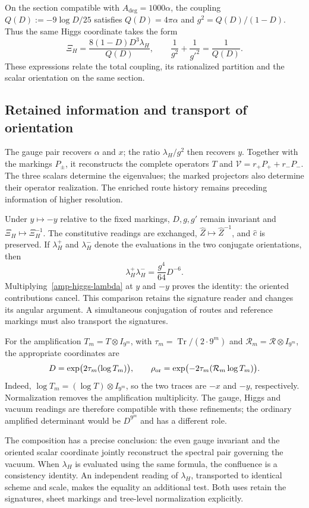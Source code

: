 On the section compatible with $A_{\deg}=1000\alpha$, the coupling
$Q(D):=-9\log D/25$ satisfies $Q(D)=4\pi\alpha$ and
$g^2=Q(D)/(1-D)$. Thus the same Higgs coordinate takes the form
\begin{equation}
 \Xi_H=\frac{8(1-D)D^3\lambda_H}{Q(D)},\qquad
 \frac1{g^2}+\frac1{g'^2}=\frac1{Q(D)}.
 \label{amp-higgs-curva}
\end{equation}
These expressions relate the total coupling, its rationalized partition
and the scalar orientation on the same section.

\subsection{Retained information and transport of orientation}

The gauge pair recovers $\alpha$ and $x$; the ratio $\lambda_H/g^2$
then recovers $y$. Together with the markings $P_\pm$, it reconstructs
the complete operators $T$ and $\mathcal V=r_+P_++r_-P_-$.
The three scalars determine the eigenvalues; the marked projectors also
determine their operator realization. The enriched route history remains
preceding information of higher resolution.

Under $y\mapsto-y$ relative to the fixed markings, $D,g,g'$ remain
invariant and $\Xi_H\mapsto\Xi_H^{-1}$. The constitutive readings are
exchanged, $\widehat Z\mapsto\widehat Z^{-1}$, and $\widehat c$ is preserved.
If $\lambda_H^+$ and $\lambda_H^-$ denote the evaluations in the two
conjugate orientations, then
\begin{equation}
 \lambda_H^+\lambda_H^-
 =\frac{g^4}{64}D^{-6}.
 \label{amp-higgs-orientacion}
\end{equation}
Multiplying~\eqref{amp-higgs-lambda} at $y$ and $-y$ proves the identity:
the oriented contributions cancel. This comparison retains the signature
reader and changes its angular argument. A simultaneous conjugation of
routes and reference markings must also transport the signatures.

For the amplification $T_m=T\otimes I_{9^m}$, with
$\tau_m=\operatorname{Tr}/(2\cdot9^m)$ and
$\mathcal R_m=\mathcal R\otimes I_{9^m}$, the appropriate coordinates are
\begin{equation}
 D=\exp\bigl(2\tau_m(\log T_m)\bigr),\qquad
 \rho_{\rm or}=\exp\bigl(-2\tau_m(\mathcal R_m\log T_m)\bigr).
 \label{amp-higgs-refinamiento}
\end{equation}
Indeed, $\log T_m=(\log T)\otimes I_{9^m}$, so the two traces are $-x$
and $-y$, respectively. Normalization removes the amplification multiplicity.
The gauge, Higgs and vacuum readings are therefore compatible with these
refinements; the ordinary amplified determinant would be $D^{9^m}$ and
has a different role.

The composition has a precise conclusion: the even gauge invariant and
the oriented scalar coordinate jointly reconstruct the spectral pair
governing the vacuum. When $\lambda_H$ is evaluated using the same formula,
the confluence is a consistency identity. An independent reading of
$\lambda_H$, transported to identical scheme and scale, makes the equality
an additional test. Both uses retain the signatures, sheet markings and
tree-level normalization explicitly.
